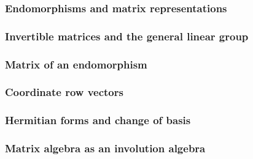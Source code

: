 \subsubsection{Endomorphisms and matrix representations}





\subsubsection{Invertible matrices and the general linear group}




\subsubsection{Matrix of an endomorphism}




\subsubsection{Coordinate row vectors}





\subsubsection{Hermitian forms and change of basis}



\subsubsection{Matrix algebra as an involution algebra}

